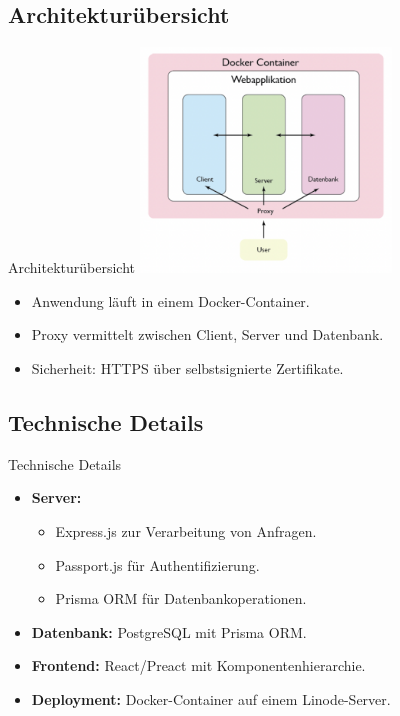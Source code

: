 \documentclass{beamer}
\begin{document}
\subsection{Architekturübersicht}
\begin{frame}{Architekturübersicht}
    \includegraphics[width=0.5\textwidth]{docker_overview.png}
    \begin{itemize}
        \item Anwendung läuft in einem Docker-Container.
        \item Proxy vermittelt zwischen Client, Server und Datenbank.
        \item Sicherheit: HTTPS über selbstsignierte Zertifikate.
    \end{itemize}
\end{frame}

\subsection{Technische Details}
\begin{frame}{Technische Details}
    \begin{itemize}
        \item \textbf{Server:}
        \begin{itemize}
            \item Express.js zur Verarbeitung von Anfragen.
            \item Passport.js für Authentifizierung.
            \item Prisma ORM für Datenbankoperationen.
        \end{itemize}
        \item \textbf{Datenbank:} PostgreSQL mit Prisma ORM.
        \item \textbf{Frontend:} React/Preact mit Komponentenhierarchie.
        \item \textbf{Deployment:} Docker-Container auf einem Linode-Server.
    \end{itemize}
\end{frame}
\end{document}
